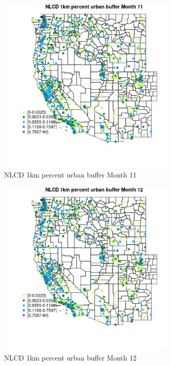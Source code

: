 \begin{figure} 
\centering  
\includegraphics[width=0.77\textwidth]{Code_Outputs/Report_ML_input_PM25_Step4_part_f_de_duplicated_aveswNAs_MapObsMo11NLCD_1km_percent_urban_buffer.jpg} 
\caption{\label{fig:Report_ML_input_PM25_Step4_part_f_de_duplicated_aveswNAsMapObsMo11NLCD_1km_percent_urban_buffer}NLCD 1km percent urban buffer Month 11} 
\end{figure} 
 

\begin{figure} 
\centering  
\includegraphics[width=0.77\textwidth]{Code_Outputs/Report_ML_input_PM25_Step4_part_f_de_duplicated_aveswNAs_MapObsMo12NLCD_1km_percent_urban_buffer.jpg} 
\caption{\label{fig:Report_ML_input_PM25_Step4_part_f_de_duplicated_aveswNAsMapObsMo12NLCD_1km_percent_urban_buffer}NLCD 1km percent urban buffer Month 12} 
\end{figure} 
 

